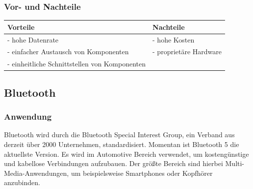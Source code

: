 \subsubsection{Vor- und Nachteile}
\begin{tabular}{l|l}
	Vorteile & Nachteile\\
	\hline - hohe Datenrate & - hohe Kosten\\
	\hline - einfacher Austausch von Komponenten & - proprietäre Hardware\\
	\hline - einheitliche Schnittstellen von Komponenten &\\
\end{tabular}

\subsection{Bluetooth}		
\subsubsection{Anwendung}
Bluetooth wird durch die Bluetooth Special Interest Group, ein Verband aus derzeit über 2000 Unternehmen,  standardisiert. Momentan ist Bluetooth 5 die aktuellste Version. Es wird im Automotive Bereich verwendet, um kostengünstige und kabellose Verbindungen aufzubauen. Der größte Bereich sind hierbei Multi-Media-Anwendungen, um beispielsweise Smartphones oder Kopfhörer anzubinden.

\cite{.BP01}

